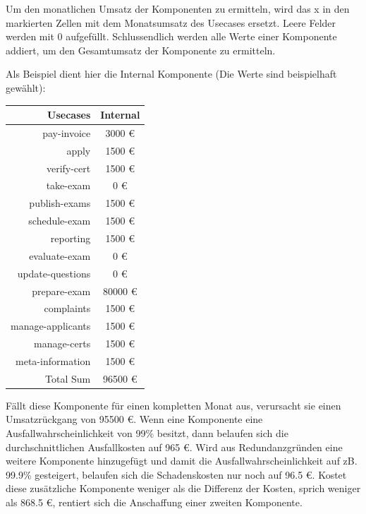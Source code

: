 Um den monatlichen Umsatz der Komponenten zu ermitteln, wird das x in den markierten Zellen mit dem Monatsumsatz des Usecases ersetzt. Leere Felder werden mit 0 aufgefüllt. Schlussendlich werden alle Werte einer Komponente addiert, um den Gesamtumsatz der Komponente zu ermitteln.

Als Beispiel dient hier die Internal Komponente (Die Werte sind beispielhaft gewählt):

\hfill \break

\begin{tabular}{ | r | c | }
    \hline
    Usecases & Internal \\
    \hline
    pay-invoice & 3000 \euro \\
    \hline
    apply & 1500 \euro \\
    \hline
    verify-cert & 1500 \euro \\
    \hline
    take-exam & 0 \euro \\
    \hline
    publish-exams & 1500 \euro \\
    \hline
    schedule-exam & 1500 \euro \\
    \hline
    reporting & 1500 \euro \\
    \hline
    evaluate-exam & 0 \euro \\
    \hline
    update-questions & 0 \euro \\
    \hline
    prepare-exam & 80000 \euro \\
    \hline
    complaints & 1500 \euro \\
    \hline
    manage-applicants & 1500 \euro \\
    \hline
    manage-certs & 1500 \euro \\
    \hline
    meta-information & 1500 \euro \\
    \hline
    Total Sum & 96500 \euro \\
    \hline
\end{tabular}

\hfill \break

Fällt diese Komponente für einen kompletten Monat aus, verursacht sie einen Umsatzrückgang von 95500 \euro. Wenn eine Komponente eine Ausfallwahrscheinlichkeit von 99\% besitzt, dann belaufen sich die durchschnittlichen Ausfallkosten auf 965 \euro. Wird aus Redundanzgründen eine weitere Komponente hinzugefügt und damit die Ausfallwahrscheinlichkeit auf zB. 99.9\% gesteigert, belaufen sich die Schadenskosten nur noch auf 96.5 \euro. Kostet diese zusätzliche Komponente weniger als die Differenz der Kosten, sprich weniger als 868.5 \euro, rentiert sich die Anschaffung einer zweiten Komponente.

